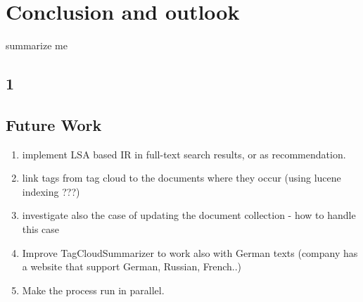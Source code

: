 \chapter{Conclusion and outlook}
\label{sec:conclusion}

\begin{summary}
summarize me
\end{summary}

\section{1}
\label{sec:conclusion:1}

\section{Future Work}
\begin{enumerate}
\item implement LSA based IR in full-text search results, or as recommendation.
\item link tags from tag cloud to the documents where they occur (using lucene indexing ???)
\item investigate also the case of updating the document collection - how to handle this case
\item Improve TagCloudSummarizer to work also with German texts (company has a website that support German, Russian, French..)
\item Make the process run in parallel.
\end{enumerate}
